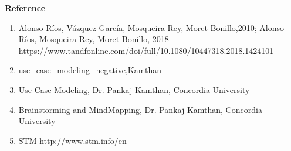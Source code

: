 \documentclass[12pt]{report}
\begin{document}
\printglossaries
\clearpage
\LARGE \textbf {Reference}\normalsize
\begin{enumerate}
\item Alonso-Ríos, Vázquez-García, Mosqueira-Rey, Moret-Bonillo,2010; Alonso-Ríos, Mosqueira-Rey, Moret-Bonillo, 2018\\
https://www.tandfonline.com/doi/full/10.1080/10447318.2018.1424101
\item use\_case\_modeling\_negative,Kamthan \\
\item Use Case Modeling, Dr. Pankaj Kamthan, Concordia University \\ 
\item Brainstorming and MindMapping, Dr. Pankaj Kamthan, Concordia University \\
\item STM  http://www.stm.info/en \\
\end{enumerate}
\end{document}
